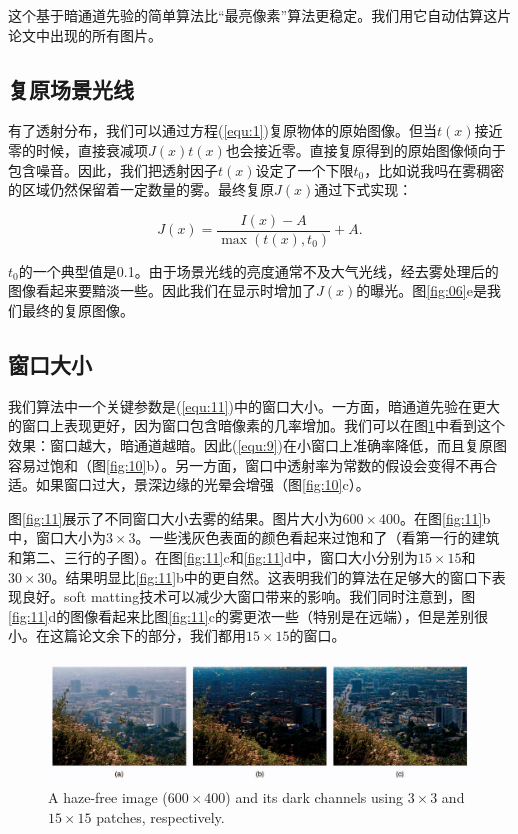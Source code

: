 \documentclass{ctexart}
\begin{document}
这个基于暗通道先验的简单算法比“最亮像素”算法更稳定。我们用它自动估算这片论文中出现的所有图片。\par


\subsection{复原场景光线}
有了透射分布，我们可以通过方程(\ref{equ:1})复原物体的原始图像。但当$t(x)$接近零的时候，直接衰减项$J(x)t(x)$也会接近零。直接复原得到的原始图像倾向于包含噪音。因此，我们把透射因子$t(x)$设定了一个下限$t_0$，比如说我吗在雾稠密的区域仍然保留着一定数量的雾。最终复原$J(x)$通过下式实现：

\begin{equation}\label{equ:22}
	J(x) = \frac{I(x) - A}{\max(t(x), t_0)} + A.
\end{equation}

$t_0$的一个典型值是0.1。由于场景光线的亮度通常不及大气光线，经去雾处理后的图像看起来要黯淡一些。因此我们在显示时增加了$J(x)$的曝光。图\ref{fig:06}e是我们最终的复原图像。\par


\subsection{窗口大小}
我们算法中一个关键参数是(\ref{equ:11})中的窗口大小。一方面，暗通道先验在更大的窗口上表现更好，因为窗口包含暗像素的几率增加。我们可以在图\ref{fig:09}中看到这个效果：窗口越大，暗通道越暗。因此(\ref{equ:9})在小窗口上准确率降低，而且复原图容易过饱和（图\ref{fig:10}b）。另一方面，窗口中透射率为常数的假设会变得不再合适。如果窗口过大，景深边缘的光晕会增强（图\ref{fig:10}c）。\par

图\ref{fig:11}展示了不同窗口大小去雾的结果。图片大小为$600 \times  400$。在图\ref{fig:11}b中，窗口大小为$3 \times 3$。一些浅灰色表面的颜色看起来过饱和了（看第一行的建筑和第二、三行的子图）。在图\ref{fig:11}c和\ref{fig:11}d中，窗口大小分别为$15 \times 15$和$30 \times 30$。结果明显比\ref{fig:11}b中的更自然。这表明我们的算法在足够大的窗口下表现良好。soft matting技术可以减少大窗口带来的影响。我们同时注意到，图\ref{fig:11}d的图像看起来比图\ref{fig:11}c的雾更浓一些（特别是在远端），但是差别很小。在这篇论文余下的部分，我们都用$15 \times 15$的窗口。


\begin{figure}[tbp]
	\centering
	\includegraphics[width=\textwidth]{img/09.jpg}
	\caption{A haze-free image ($600 \times  400$) and its dark channels using $3 \times  3$ and $15 \times  15$ patches, respectively.}\label{fig:09}
\end{figure}
\end{document}
